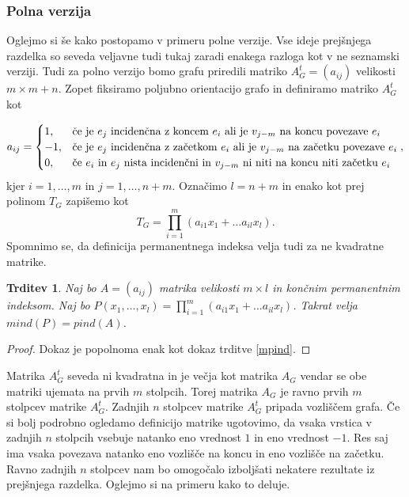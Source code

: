 \documentclass[12pt,a4paper,twoside]{article}
\theoremstyle{definition} %
\theoremstyle{plain} %
\newtheorem{trditev}[definicija]{Trditev}
\numberwithin{equation}{section}  %
\begin{document}
\subsubsection{Polna verzija}
Oglejmo si še kako postopamo v primeru polne verzije. Vse ideje prejšnjega razdelka so seveda veljavne tudi tukaj zaradi enakega razloga kot v ne seznamski verziji. Tudi za polno verzijo bomo grafu priredili matriko $A_G^t = (a_{ij})$ velikosti $m \times m+n$. Zopet fiksiramo poljubno orientacijo grafo in definiramo matriko $A_G^t$ kot

\begin{equation*}
a_{ij} = 
\begin{cases}

1, & \text{če je $e_j$ incidenčna z koncem $e_i$ ali je $v_{j-m}$ na koncu povezave $e_i$}\\ 
	-1, & \text{če je $ e_j$ incidenčna z začetkom  $e_i$ ali je $v_{j-m}$ na začetku povezave $e_i$} \\

0, & \text{če $e_i$ in $e_j$ nista incidenčni in $v_{j-m}$ ni niti na koncu niti začetku $e_i$}
\end{cases},
\end{equation*}
kjer $i=1,\ldots, m$ in $j=1, \ldots, n+m$. Označimo $l=n+m$ in enako kot prej  polinom $T_G$ zapišemo kot 
$$T_G = \prod_{i=1}^m (a_{i1}x_1 + \ldots a_{il}x_l).$$
Spomnimo se, da definicija permanentnega indeksa velja tudi za ne kvadratne matrike.
\begin{trditev}
Naj bo $A = (a_{ij})$  matrika velikosti $m \times l$ in končnim permanentnim indeksom. Naj bo $P(x_1, \ldots, x_l) = \prod_{i=1}^m (a_{i1}x_1 + \ldots a_{il}x_l)$. Takrat velja $mind(P) = pind(A)$.
\end{trditev}
\begin{proof}
Dokaz je popolnoma enak kot dokaz trditve \ref{mpind}.
\end{proof}
Matrika $A_G^t$ seveda ni kvadratna in je večja kot matrika $A_G$ vendar se obe matriki ujemata na prvih $m$ stolpcih. Torej matrika $A_G$ je ravno prvih $m$ stolpcev matrike $A_G^t$. Zadnjih $n$ stolpcev matrike $A_G^t$ pripada vozliščem grafa. Če si bolj podrobno ogledamo definicijo matrike ugotovimo, da vsaka vrstica v zadnjih $n$ stolpcih vsebuje natanko eno vrednost $1$ in eno vrednost $-1$. Res saj ima vsaka povezava natanko eno vozlišče na koncu in eno vozlišče na začetku. Ravno zadnjih $n$ stolpcev nam bo omogočalo izboljšati nekatere rezultate iz prejšnjega razdelka. Oglejmo si na primeru kako to deluje.
\end{document}
